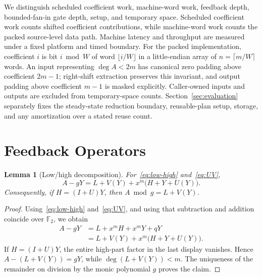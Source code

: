 \documentclass{mcom-l}
\numberwithin{equation}{section}
\newtheorem{lemma}[theorem]{Lemma}
\theoremstyle{definition}
\theoremstyle{remark}
\newcommand{\Ftwo}{\mathbb{F}_2}
\begin{document}
We distinguish scheduled coefficient work, machine-word work, feedback depth,
bounded-fan-in gate depth, setup, and temporary space.  Scheduled coefficient
work counts shifted coefficient contributions, while machine-word work counts
the packed source-level data path. Machine latency and throughput are measured
under a fixed platform and timed boundary.
For the packed implementation, coefficient $i$ is bit $i\bmod W$ of word
$\lfloor i/W\rfloor$ in a little-endian array of
$n=\lceil m/W\rceil$ words.  An input representing $\deg A<2m$ has canonical
zero padding above coefficient $2m-1$; right-shift extraction preserves this
invariant, and output padding above coefficient $m-1$ is masked explicitly.
Caller-owned inputs and outputs are excluded from temporary-space counts.
Section~\ref{sec:evaluation} separately fixes
the steady-state reduction boundary, reusable-plan setup, storage, and any
amortization over a stated reuse count.

\section{Feedback Operators}
\label{sec:operators}

\begin{lemma}[Low/high decomposition]
\label{lem:decomposition}
For~\eqref{eq:low-high} and~\eqref{eq:UV},
\begin{equation}
  A-gY=L+V(Y)+x^m\bigl(H+Y+U(Y)\bigr).
\end{equation}
Consequently, if $H=(I+U)Y$, then $A\bmod g=L+V(Y)$.
\end{lemma}
\begin{proof}
Using~\eqref{eq:low-high} and~\eqref{eq:UV}, and using that subtraction and
addition coincide over $\Ftwo$, we obtain
\begin{align*}
  A-gY
  &=L+x^mH+x^mY+qY\\
  &=L+V(Y)+x^m\bigl(H+Y+U(Y)\bigr).
\end{align*}
If $H=(I+U)Y$, the entire high-part factor in the last display vanishes.
Hence $A-(L+V(Y))=gY$, while $\deg(L+V(Y))<m$.  The uniqueness of the
remainder on division by the monic polynomial $g$ proves the claim.
\end{proof}
\end{document}

